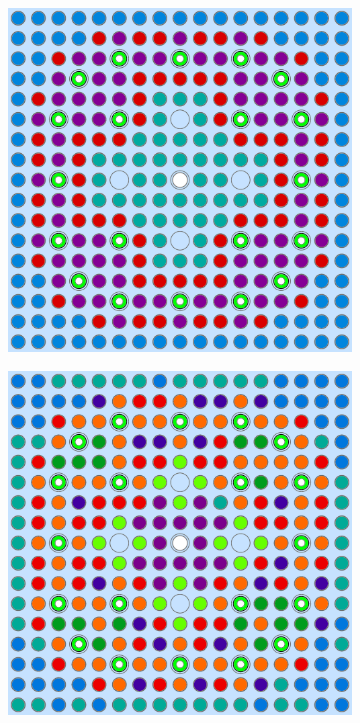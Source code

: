 \begin{figure}[h!]
\begin{subfigure}{0.48\textwidth}
  \caption{}
  \label{fig:chap10-assm-31-20BPs-pinch-4}
\end{subfigure}%
\begin{subfigure}{0.48\textwidth}
  \centering
  \includegraphics[width=0.9\linewidth]{figures/unsupervised/geometries/with-features/4-clusters/combined/assm-31-20BPs}
  \caption{}
  \label{fig:chap10-assm-31-20BPs-combined-4}
\end{subfigure}
\begin{subfigure}{0.48\textwidth}
  \centering
  \includegraphics[width=0.9\linewidth]{figures/unsupervised/geometries/with-features/8-clusters/pinch/assm-31-20BPs}

\end{subfigure}
\end{figure}
